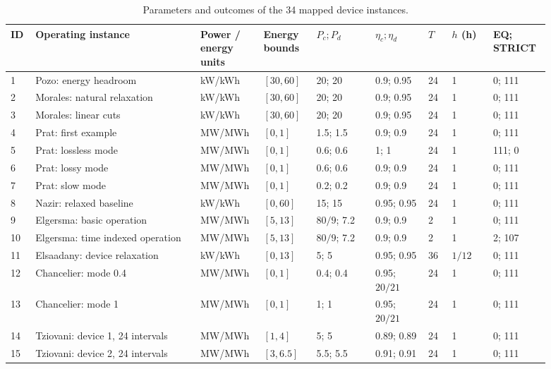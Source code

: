 \begin{landscape}
\begingroup
\setlength{\LTpost}{3pt}
\begin{longtable}{@{}p{0.045\linewidth}p{0.28\linewidth}p{0.09\linewidth}p{0.09\linewidth}p{0.1\linewidth}p{0.09\linewidth}p{0.04\linewidth}p{0.07\linewidth}p{0.09\linewidth}@{}}
\caption{Parameters and outcomes of the 34 mapped device instances.}\label{tab:external_parameters}\\
\toprule ID & Operating instance & Power / energy units & Energy bounds & $P_c; P_d$ & $\eta_c; \eta_d$ & $T$ & $h$ (h) & EQ; STRICT\\
\midrule\bottomrule
1 & Pozo: energy headroom & kW/kWh & $[30,60]$ & 20; 20 & 0.9; 0.95 & 24 & 1 & 0; 111\\
2 & Morales: natural relaxation & kW/kWh & $[30,60]$ & 20; 20 & 0.9; 0.95 & 24 & 1 & 0; 111\\
3 & Morales: linear cuts & kW/kWh & $[30,60]$ & 20; 20 & 0.9; 0.95 & 24 & 1 & 0; 111\\
4 & Prat: first example & MW/MWh & $[0,1]$ & 1.5; 1.5 & 0.9; 0.9 & 24 & 1 & 0; 111\\
5 & Prat: lossless mode & MW/MWh & $[0,1]$ & 0.6; 0.6 & 1; 1 & 24 & 1 & 111; 0\\
6 & Prat: lossy mode & MW/MWh & $[0,1]$ & 0.6; 0.6 & 0.9; 0.9 & 24 & 1 & 0; 111\\
7 & Prat: slow mode & MW/MWh & $[0,1]$ & 0.2; 0.2 & 0.9; 0.9 & 24 & 1 & 0; 111\\
8 & Nazir: relaxed baseline & kW/kWh & $[0,60]$ & 15; 15 & 0.95; 0.95 & 24 & 1 & 0; 111\\
9 & Elgersma: basic operation & MW/MWh & $[5,13]$ & $80/9$; 7.2 & 0.9; 0.9 & 2 & 1 & 0; 111\\
10 & Elgersma: time indexed operation & MW/MWh & $[5,13]$ & $80/9$; 7.2 & 0.9; 0.9 & 2 & 1 & 2; 107\\
11 & Elsaadany: device relaxation & kW/kWh & $[0,13]$ & 5; 5 & 0.95; 0.95 & 36 & $1/12$ & 0; 111\\
12 & Chancelier: mode 0.4 & MW/MWh & $[0,1]$ & 0.4; 0.4 & 0.95; $20/21$ & 24 & 1 & 0; 111\\
13 & Chancelier: mode 1 & MW/MWh & $[0,1]$ & 1; 1 & 0.95; $20/21$ & 24 & 1 & 0; 111\\
14 & Tziovani: device 1, 24 intervals & MW/MWh & $[1,4]$ & 5; 5 & 0.89; 0.89 & 24 & 1 & 0; 111\\
15 & Tziovani: device 2, 24 intervals & MW/MWh & $[3,6.5]$ & 5.5; 5.5 & 0.91; 0.91 & 24 & 1 & 0; 111\\

\end{longtable}
\end{landscape}
